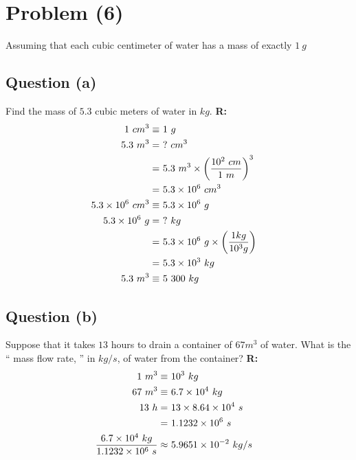 \section{Problem (6)}
	Assuming that each cubic centimeter of water has a mass of exactly $1 \ g$

	\subsection{Question (a)}
		Find the mass of $5.3$ cubic meters of water in $kg$. \newline
		\textbf{R:} \newline
		\begin{align}
			1 \ cm^{3} \equiv \ & 1 \ g & \\
			5.3 \ m^{3} = \ & ? \ cm^{3} & \notag \\
			= \ & 5.3 \ m^{3}
			\times \left( \frac{10^{2} \ cm}{1 \ m} \right)^{3}& \notag \\
			= \ & 5.3 \times 10^{6} \ cm^{3}& \\
			5.3 \times 10^{6} \ cm^{3} \equiv \ & 5.3 \times 10^{6} \ g & \\
			5.3 \times 10^{6} \ g = \ & ? \ kg & \notag \\
			= \ & 5.3 \times 10^{6} \ g
			\times \left( \frac{1 kg}{10^{3} g} \right)& \notag \\
			= \ & 5.3 \times 10^{3} \ kg \\
			5.3 \ m^{3} \equiv \ & 5 \ 300 \ kg &
		\end{align}

	\subsection{Question (b)}
		Suppose that it takes $13$ hours to drain a container of $67 m^{3}$ of water. What is the `` mass flow rate, '' in $kg/s$, of water from the container? \newline
		\textbf{R:} \newline
		\begin{align}
			1 \ m^{3} \equiv \ & 10^{3} \ kg & \\
			67 \ m^{3} \equiv \ & 6.7 \times 10^{4} \ kg & \\
			13 \ h = \ & 13 \times 8.64 \times 10^{4} \ s & \notag \\
			= \ & 1.1232 \times 10^{6} \ s & \\
			\frac{6.7 \times 10^{4} \ kg}{1.1232 \times 10^{6} \ s}
			\approx \ & 5.9651 \times 10^{-2} \ kg/s &
		\end{align}
